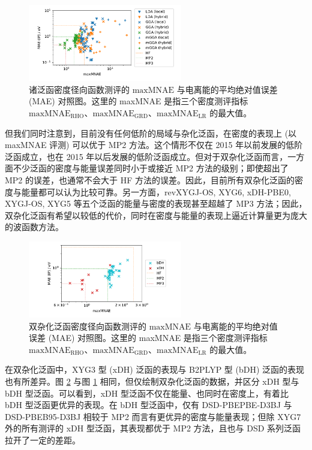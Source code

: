 \begin{figure}[t]
    \centering
    \includegraphics[width=0.6\textwidth]{assets/compare-err-maxMNAE-MAEIP.pdf}
    \caption{诸泛函密度径向函数测评的 $\text{maxMNAE}$ 与电离能的平均绝对值误差 (MAE) 对照图。这里的 maxMNAE 是指三个密度测评指标 $\text{maxMNAE}_\text{RHO}$、$\text{maxMNAE}_\text{GRD}$、$\text{maxMNAE}_\text{LR}$ 的最大值。}
    \label{fig.4.compare-err-maxMNAE-MAEIP}
\end{figure}

但我们同时注意到，目前没有任何低阶的局域与杂化泛函，在密度的表现上 (以 maxMNAE 评测) 可以优于 MP2 方法。这个情形不仅在 2015 年以前发展的低阶泛函成立，也在 2015 年以后发展的低阶泛函成立。但对于双杂化泛函而言，一方面不少泛函的密度与能量误差同时小于或接近 MP2 方法的级别；即使超出了 MP2 的误差，也通常不会大于 HF 方法的误差。因此，目前所有双杂化泛函的密度与能量都可以认为比较可靠。另一方面，revXYGJ-OS, XYG6, xDH-PBE0, XYGJ-OS, XYG5 等五个泛函的能量与密度的表现甚至超越了 MP3 方法；因此，双杂化泛函有希望以较低的代价，同时在密度与能量的表现上逼近计算量更为庞大的波函数方法。

\begin{figure}[t]
    \centering
    \includegraphics[width=0.6\textwidth]{assets/compare-err-maxMNAE-MAEIP-dh.pdf}
    \caption{双杂化泛函密度径向函数测评的 $\text{maxMNAE}$ 与电离能的平均绝对值误差 (MAE) 对照图。这里的 maxMNAE 是指三个密度测评指标 $\text{maxMNAE}_\text{RHO}$、$\text{maxMNAE}_\text{GRD}$、$\text{maxMNAE}_\text{LR}$ 的最大值。}
    \label{fig.4.compare-err-maxMNAE-MAEIP-dh}
\end{figure}

在双杂化泛函中，XYG3 型 (xDH) 泛函的表现与 B2PLYP 型 (bDH) 泛函的表现也有所差异。图 \ref{fig.4.compare-err-maxMNAE-MAEIP-dh} 与图 \ref{fig.4.compare-err-maxMNAE-MAEIP} 相同，但仅绘制双杂化泛函的数据，并区分 xDH 型与 bDH 型泛函。可以看到，xDH 型泛函不仅在能量、也同时在密度上，有着比 bDH 型泛函更优异的表现。在 bDH 型泛函中，仅有 DSD-PBEPBE-D3BJ 与 DSD-PBEB95-D3BJ 相较于 MP2 而言有更优异的密度与能量表现；但除 XYG7 外的所有测评的 xDH 型泛函，其表现都优于 MP2 方法，且也与 DSD 系列泛函拉开了一定的差距。


